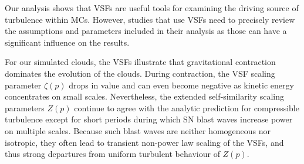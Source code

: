 Our analysis shows that VSFs are useful tools for examining the driving source of turbulence within MCs.
However, studies that use VSFs need to precisely review the assumptions and parameters included in their analysis as those can have a significant influence on the results.

For our simulated clouds, the VSFs illustrate that gravitational contraction dominates the evolution of the clouds.
During contraction, the VSF scaling parameter $\zeta(p)$ drops in value and can even become negative as kinetic energy concentrates on small scales.
Nevertheless, the extended self-similarity scaling parameters $Z(p)$ continue to agree with the analytic prediction for compressible turbulence except for short periods during which SN blast waves increase power on multiple scales.
Because such blast waves are neither homogeneous nor isotropic, they often lead to transient non-power law scaling of the VSFs, and thus strong departures from uniform turbulent behaviour of $Z(p)$.



\endinput
